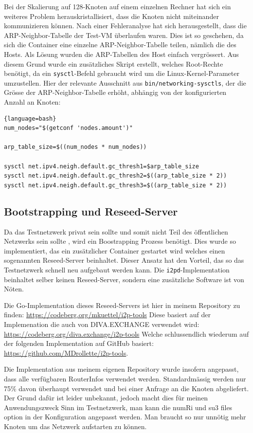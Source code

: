 Bei der Skalierung auf 128-Knoten auf einem einzelnen Rechner hat sich ein weiteres Problem herauskristallisiert,
dass die Knoten nicht miteinander kommunizieren können.
Nach einer Fehleranalyse hat sich herausgestellt, dass die ARP-Neighbor-Tabelle der
Test-VM überlaufen waren.
Dies ist so geschehen, da sich die Container eine einzelne ARP-Neighbor-Tabelle teilen, nämlich die des Hosts.
Als Lösung wurden die ARP-Tabellen des Host einfach vergrössert.
Aus diesem Grund wurde ein zusätzliches Skript erstellt, welches Root-Rechte benötigt, da ein \lstinline|sysctl|-Befehl gebraucht wird um die Linux-Kernel-Parameter umzustellen.
Hier der relevante Ausschnitt aus \lstinline|bin/networking-sysctls|, der die Grösse der ARP-Neighbor-Tabelle erhöht, abhängig von der konfigurierten Anzahl an Knoten:
\begin{lstlisting}[firstnumber=9]{language=bash}
num_nodes="$(getconf 'nodes.amount')"

arp_table_size=$((num_nodes * num_nodes))

sysctl net.ipv4.neigh.default.gc_thresh1=$arp_table_size
sysctl net.ipv4.neigh.default.gc_thresh2=$((arp_table_size * 2))
sysctl net.ipv4.neigh.default.gc_thresh3=$((arp_table_size * 2))
\end{lstlisting}

\subsection{Bootstrapping und Reseed-Server}

Da das Testnetzwerk privat sein sollte und somit nicht Teil des öffentlichen Netzwerks sein sollte , wird ein Boostrapping Prozess benötigt.
Dies wurde so implementiert, das ein zusätzlicher Container gestartet wird welches einen sogenannten Reseed-Server beinhaltet.
Dieser Ansatz hat den Vorteil, das so das Testnetzwerk schnell neu aufgebaut werden kann.
Die \lstinline|i2pd|-Implementation beinhaltet selber keinen Reseed-Server, sondern eine zusätzliche Software ist von Nöten.

Die Go-Implementation dieses Reseed-Servers ist hier in meinem Repository zu finden: \url{https://codeberg.org/mkuettel/i2p-tools}
Diese basiert auf der Implemenation die auch von DIVA.EXCHANGE verwendet wird: \url{https://codeberg.org/diva.exchange/i2p-tools}
Welche schlussendlich wiederum auf der folgenden Implementation auf GitHub basiert:  \url{https://github.com/MDrollette/i2p-tools}.

Die Implementation aus meinem eigenen Repository wurde insofern angepasst,
dass alle verfügbaren RouterInfos verwendet werden. Standardmässig werden nur 75\% davon überhaupt verwendet und bei einer Anfrage an die Knoten abgeliefert.
Der Grund dafür ist leider unbekannt, jedoch macht dies für meinen Anwendungszweck Sinn im Testnetzwerk, man kann die numRi und su3 files option in der Konfiguration angepasst werden.
Man braucht so nur unnötig mehr Knoten um das Netzwerk aufstarten zu können.

